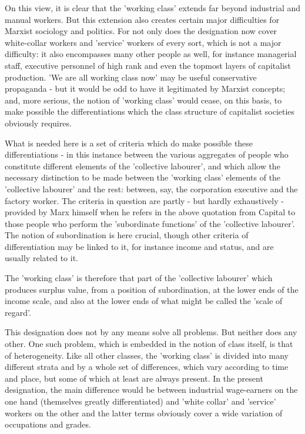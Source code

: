 On this view, it is clear that the 'working class' extends far beyond industrial and manual workers. But this extension also creates certain major difficulties for Marxist sociology and politics. For not only does the designation now cover white-collar workers and 'service' workers of every sort, which is not a major difficulty: it also encompasses many other people as well, for instance managerial staff, executive personnel of high rank and even the topmost layers of capitalist production. 'We are all working class now' may be useful conservative propaganda  - but it would be odd to have it legitimated by Marxist concepts; and, more serious, the notion of 'working class' would cease, on this basis, to make possible the differentiations which the class structure of capitalist societies obviously requires.

What is needed here is a set of criteria which do make possible these differentiations - in this instance between the various aggregates of people who constitute different elements of the 'collective labourer', and which allow the necessary distinction to be made between the 'working class' elements of the 'collective labourer' and the rest: between, say, the corporation executive and the factory worker. The criteria in question are partly  - but hardly exhaustively - provided by Marx himself when he refers in the above quotation from Capital to those people who perform the 'subordinate functions' of the 'collective labourer'. The notion of subordination is here crucial, though other criteria of differentiation may be linked to it, for instance income and status, and are usually related to it.

The 'working class' is therefore that part of the 'collective labourer' which produces surplus value, from a position of subordination, at the lower ends of the income scale, and also at the lower ends of what might be called the 'scale of regard'.

This designation does not by any means solve all problems. But neither does any other. One such problem, which is embedded in the notion of class itself, is that of heterogeneity. Like all other classes, the 'working class' is divided into many different strata and by a whole set of differences, which vary according to  time and place, but some of which at least are always present. In the present designation, the main difference would be between industrial wage-earners on the one hand (themselves greatly differentiated) and 'white collar' and 'service' workers on the other and the latter terms obviously cover a wide variation of occupations and grades.

